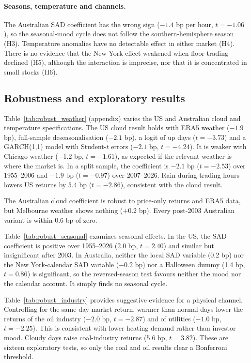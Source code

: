 \documentclass[11pt]{article}
\begin{document}
\paragraph{Seasons, temperature and channels.} The Australian SAD coefficient has the wrong sign
($-1.4$ bp per hour, $t=-1.06$), so the seasonal-mood cycle does not follow the southern-hemisphere
season (H3). Temperature anomalies have no detectable effect in either market (H4). There is no
evidence that the New York effect weakened when floor trading declined (H5), although the
interaction is imprecise, nor that it is concentrated in small stocks (H6).

\subsection{Robustness and exploratory results}

Table~\ref{tab:robust_weather} (appendix) varies the US and Australian cloud and temperature
specifications. The US cloud result holds with ERA5 weather ($-1.9$ bp), full-sample
deseasonalisation ($-2.1$ bp), a logit of up days ($t=-3.73$) and a GARCH(1,1) model with
Student-$t$ errors ($-2.1$ bp, $t=-4.24$). It is weaker with Chicago weather ($-1.2$ bp, $t=-1.61$),
as expected if the relevant weather is where the market is. In a split sample, the coefficient is
$-2.1$ bp ($t=-2.53$) over 1955--2006 and $-1.9$ bp ($t=-0.97$) over 2007--2026. Rain during
trading hours lowers US returns by 5.4 bp ($t=-2.86$), consistent with the cloud result.

The Australian cloud coefficient is robust to price-only returns and ERA5 data, but Melbourne weather
shows nothing ($+0.2$ bp). Every post-2003 Australian variant is within 0.6 bp of zero.

Table~\ref{tab:robust_seasonal} examines seasonal effects. In the US, the SAD coefficient is
positive over 1955--2026 (2.0 bp, $t=2.40$) and similar but insignificant after 2003. In
Australia, neither the local SAD variable (0.2 bp) nor the New York-calendar SAD variable
($-0.2$ bp) nor a Halloween dummy (1.4 bp, $t=0.86$) is significant, so the reversed-season test
favours neither the mood nor the calendar account. It simply finds no seasonal cycle.

Table~\ref{tab:robust_industry} provides suggestive evidence for a physical channel. Controlling
for the same-day market return, warmer-than-normal days lower the returns of the oil industry
($-2.0$ bp, $t=-2.87$) and of utilities ($-1.0$ bp, $t=-2.25$). This is consistent with lower
heating demand rather than investor mood. Cloudy days raise coal-industry returns (5.6 bp,
$t=3.82$). These are sixteen exploratory tests, so only the coal and oil results clear a
Bonferroni threshold.
\end{document}

